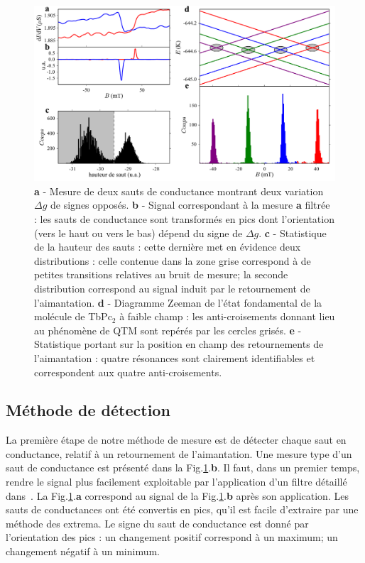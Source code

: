 \begin{figure}
\includegraphics[scale=0.45]{Resultats/CondJump/CondJump.pdf} 
\caption{\textbf{a} - Mesure de deux sauts de conductance montrant deux variation $\Delta g$ de signes opposés. \textbf{b} - Signal correspondant à la mesure \textbf{a} filtrée : les sauts de conductance sont transformés en pics dont l'orientation (vers le haut ou vers le bas) dépend du signe de $\Delta g$. \textbf{c} - Statistique de la hauteur des sauts : cette dernière met en évidence deux distributions : celle contenue dans la zone grise correspond à de petites transitions relatives au bruit de mesure; la seconde distribution correspond au signal induit par le retournement de l'aimantation. \textbf{d} - Diagramme Zeeman de l'état fondamental de la molécule de TbPc$_2$ à faible champ : les anti-croisements donnant lieu au phénomène de QTM sont repérés par les cercles grisés. \textbf{e} - Statistique portant sur la position en champ des retournements de l'aimantation : quatre résonances sont clairement identifiables et correspondent aux quatre anti-croisements.}
\label{analyse_saut}
\end{figure}


\subsection{Méthode de détection}
La première étape de notre méthode de mesure est de détecter chaque saut en conductance, relatif à un retournement de l'aimantation. Une mesure type d'un saut de conductance est présenté dans la Fig.\ref{analyse_saut}.\textbf{b}. Il faut, dans un premier temps, rendre le signal plus facilement exploitable par l'application d'un filtre détaillé dans~\cite{Y.1995}. La Fig.\ref{analyse_saut}.\textbf{a} correspond au signal de la Fig.\ref{analyse_saut}.\textbf{b} après son application. Les sauts de conductances ont été convertis en pics, qu'il est facile d'extraire par une méthode des extrema. Le signe du saut de conductance est donné par l'orientation des pics : un changement positif correspond à un maximum; un changement négatif à un minimum.

